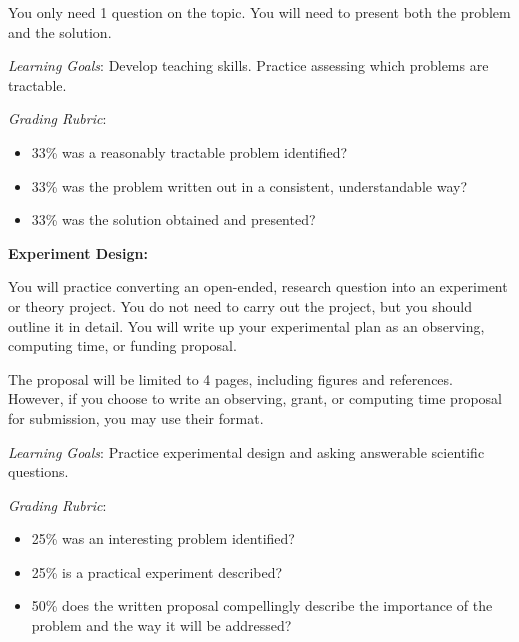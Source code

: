 \documentclass{article}
\begin{document}
You only need 1 question on the topic.  
You will need to present both the problem and the solution.

\textit{Learning Goals}:
    Develop teaching skills.  Practice assessing which problems are tractable.

\textit{Grading Rubric}:
\begin{itemize}
    \item 33\% was a reasonably tractable problem identified?
    \item 33\% was the problem written out in a consistent, understandable way?
    \item 33\% was the solution obtained and presented?
\end{itemize}

\noindent \textbf{Experiment Design:}

You will practice converting an open-ended, research question into an 
experiment or theory project.
You do not need to carry out the project, but you should outline it in
detail.
You will write up your experimental plan as an observing, computing time,
or funding proposal.

The proposal will be limited to 4 pages, including figures and references.
However, if you choose to write an observing, grant, or computing time proposal
for submission, you may use their format.

\textit{Learning Goals}:
    Practice experimental design and asking answerable scientific questions.

\textit{Grading Rubric}:
\begin{itemize}
    \item 25\% was an interesting problem identified?
    \item 25\% is a practical experiment described?
    \item 50\% does the written proposal compellingly describe the importance of the problem and the way it will be addressed?
\end{itemize}


\clearpage
\end{document}

